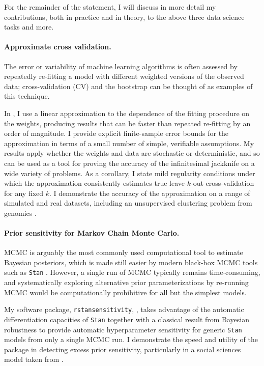 For the remainder of the statement, I will discuss in more detail my
contributions, both in practice and in theory, to the above three data science
tasks and more.


\newpage

\paragraph{Approximate cross validation.}

The error or variability of machine learning algorithms is often assessed by
repeatedly re-fitting a model with different weighted versions of the observed
data; cross-validation (CV) and the bootstrap can be thought of as examples of
this technique.

In \citet{giordano:2019:ij}, I use a linear approximation to the
dependence of the fitting procedure on the weights, producing results that can
be faster than repeated re-fitting by an order of magnitude. I provide explicit
finite-sample error bounds for the approximation in terms of a small number of
simple, verifiable assumptions.  My results apply whether the weights and data
are stochastic or deterministic, and so can be used as a tool for proving the
accuracy of the infinitesimal jackknife on a wide variety of problems. As a
corollary, I state mild regularity conditions under which the approximation
consistently estimates true leave-$k$-out cross-validation for any fixed $k$. I
demonstrate the accuracy of the approximation on a range of simulated and real
datasets, including an unsupervised clustering problem from genomics
\citep{Luan:2003:clustering, shoemaker:2015:ultrasensitive}.


\paragraph{Prior sensitivity for Markov Chain Monte Carlo.}

MCMC is arguably the most commonly used computational tool to estimate Bayesian
posteriors, which is made still easier by modern black-box MCMC tools such as
\texttt{Stan} \citep{carpenter:2017:stan, rstan}.  However, a single run of MCMC
typically remains time-consuming, and systematically exploring alternative prior
parameterizations by re-running MCMC would be computationally prohibitive for
all but the simplest models.

My software package, \texttt{rstansensitivity},
\citep{giordano:2020:rstansensitivity, giordano:2018:mcmchyper}, takes advantage
of the automatic differentiation capacities of \texttt{Stan}
\citep{carpenter:2015:stanmath} together with a classical result from  Bayesian
robustness \citep{gustafson:1996:localposterior, basu:1996:local,
giordano:2018:covariances} to provide automatic hyperparameter sensitivity for
generic \texttt{Stan} models from only a single MCMC run.  I demonstrate the
speed and utility of the package in detecting excess prior sensitivity,
particularly in a social sciences model taken from \citet[Chapter
13.5]{gelman:2006:arm}.


